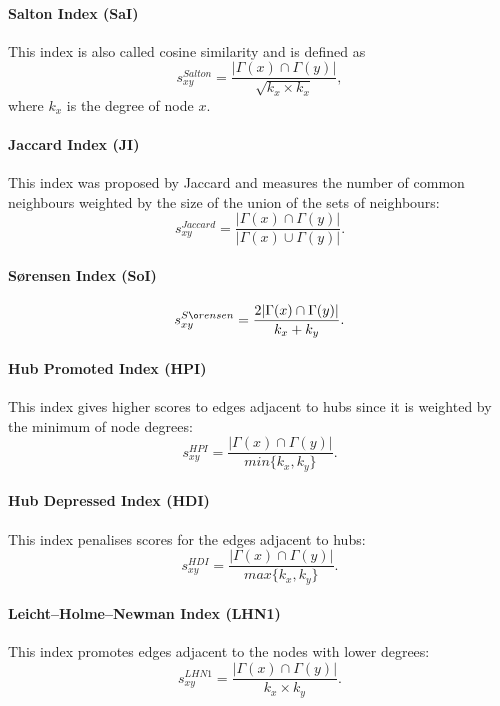 \documentclass{llncs}
\begin{document}
\paragraph{Salton Index (SaI) \cite{salton-index}}
%
This index is also called cosine similarity and is defined as
\begin{equation}
s_{xy}^{Salton} = \frac{|\Gamma(x) \cap \Gamma(y)|}{\sqrt{k_x \times k_x}},
\end{equation}
where $k_x$ is the degree of node $x$.
%
\paragraph{Jaccard Index (JI) \cite{jaccard-index}}
%
This index was proposed by Jaccard and measures the number of common neighbours weighted by the size of the union of the sets of neighbours:
\begin{equation}
s_{xy}^{Jaccard} = \frac{|\Gamma(x) \cap \Gamma(y)|}{|\Gamma(x) \cup \Gamma(y)|}.
\end{equation}
%
\paragraph{S{\o}rensen Index (SoI) \cite{sorensen-index}}
%
\begin{equation}
s_{xy}^{S{\o}rensen} = \frac{2|\Gamma(x) \cap \Gamma(y)|}{k_x + k_y}.
\end{equation}
%
\paragraph{Hub Promoted Index (HPI) \cite{hub-index}}
%
This index gives higher scores to edges adjacent to hubs since it is weighted by the minimum of node degrees:
\begin{equation}
s_{xy}^{HPI} = \frac{|\Gamma(x) \cap \Gamma(y)|}{min\{k_x, k_y\}}.
\end{equation}
%
\paragraph{Hub Depressed Index (HDI)}
%
This index penalises scores for the edges adjacent to hubs:
\begin{equation}
s_{xy}^{HDI} = \frac{|\Gamma(x) \cap \Gamma(y)|}{max\{k_x, k_y\}}.
\end{equation}
%
\paragraph{Leicht–Holme–Newman Index (LHN1) \cite{lhn1-index}}
%
This index promotes edges adjacent to the nodes with lower degrees:
\begin{equation}
s_{xy}^{LHN1} = \frac{|\Gamma(x) \cap \Gamma(y)|}{k_x \times k_y}.
\end{equation}
%
\end{document}
